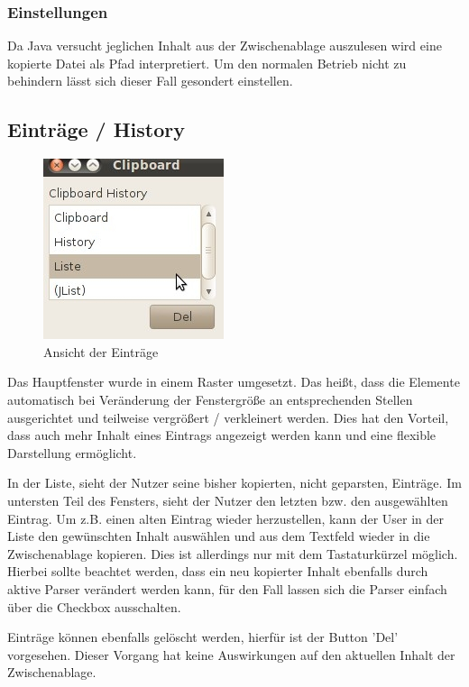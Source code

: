 \documentclass[a4paper,11pt,abstracton,titlepage]{scrartcl}
\begin{document}
\subsubsection{Einstellungen}
Da Java versucht jeglichen Inhalt aus der Zwischenablage auszulesen wird eine
kopierte Datei als Pfad interpretiert. Um den normalen Betrieb nicht zu
behindern lässt sich dieser Fall gesondert einstellen. 
\newpage
\subsection{Einträge / History}
\begin{figure}
	\begin{center}
		\setlength{\fboxsep}{0pt}
		\includegraphics[width=\dimexpr0.33\textwidth-2pt\relax]{GUI_history.png}
	\end{center}
	\caption[GUI Einträge]
  {Ansicht der Einträge}
	\label{fig:Ressourcenbaum}
\end{figure}
Das Hauptfenster wurde in einem Raster umgesetzt. Das heißt, dass die Elemente
automatisch bei Veränderung der Fenstergröße an entsprechenden Stellen
ausgerichtet und teilweise vergrößert / verkleinert werden. Dies hat den
Vorteil, dass auch mehr Inhalt eines Eintrags angezeigt werden kann und eine
flexible Darstellung ermöglicht.

In der Liste, sieht der Nutzer seine bisher kopierten, nicht geparsten,
Einträge. Im untersten Teil des Fensters, sieht der Nutzer den letzten bzw. den
ausgewählten Eintrag. Um z.B. einen alten Eintrag wieder herzustellen, kann der
User in der Liste den gewünschten Inhalt auswählen und aus dem Textfeld wieder
in die Zwischenablage kopieren. Dies ist allerdings nur mit dem Tastaturkürzel
möglich. Hierbei sollte beachtet werden, dass ein neu kopierter Inhalt ebenfalls
durch aktive Parser verändert werden kann, für den Fall lassen sich die Parser
einfach über die Checkbox ausschalten.

Einträge können ebenfalls gelöscht werden, hierfür ist der Button 'Del'
vorgesehen. Dieser Vorgang hat keine Auswirkungen auf den aktuellen Inhalt der
Zwischenablage.
\end{document}
